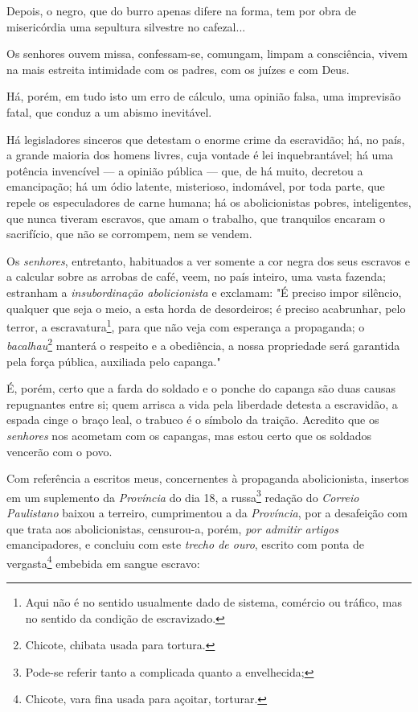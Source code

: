 Depois, o negro, que do burro apenas difere na forma, tem por obra de
misericórdia uma sepultura silvestre no cafezal...

Os senhores ouvem missa, confessam-se, comungam, limpam a consciência,
vivem na mais estreita intimidade com os padres, com os juízes e com
Deus.

Há, porém, em tudo isto um erro de cálculo, uma opinião falsa, uma
imprevisão fatal, que conduz a um abismo inevitável.

Há legisladores sinceros que detestam o enorme crime da escravidão; há,
no país, a grande maioria dos homens livres, cuja vontade é lei
inquebrantável; há uma potência invencível --- a opinião pública ---
que, de há muito, decretou a emancipação; há um ódio latente,
misterioso, indomável, por toda parte, que repele os especuladores de
carne humana; há os abolicionistas pobres, inteligentes, que nunca
tiveram escravos, que amam o trabalho, que tranquilos encaram o
sacrifício, que não se corrompem, nem se vendem.

Os \emph{senhores}, entretanto, habituados a ver somente a cor negra dos
seus escravos e a calcular sobre as arrobas de café, veem, no país
inteiro, uma vasta fazenda; estranham a \emph{insubordinação
abolicionista} e exclamam: "É preciso impor silêncio, qualquer que seja
o meio, a esta horda de desordeiros; é preciso acabrunhar, pelo terror,
a escravatura\footnote{Aqui não é no sentido usualmente dado de
  sistema, comércio ou tráfico, mas no sentido da condição de
  escravizado.}, para que não veja com esperança a propaganda; o
\emph{bacalhau}\footnote{Chicote, chibata usada para tortura.} manterá
o respeito e a obediência, a nossa propriedade será garantida pela força
pública, auxiliada pelo capanga."

É, porém, certo que a farda do soldado e o ponche do capanga são duas
causas repugnantes entre si; quem arrisca a vida pela liberdade detesta
a escravidão, a espada cinge o braço leal, o trabuco é o símbolo da
traição. Acredito que os \emph{senhores} nos acometam com os capangas,
mas estou certo que os soldados vencerão com o povo.

Com referência a escritos meus, concernentes à propaganda abolicionista,
insertos em um suplemento da \emph{Província} do dia 18, a
russa\footnote{Pode-se referir tanto a complicada quanto a
  envelhecida;} redação do \emph{Correio Paulistano} baixou a terreiro,
cumprimentou a da \emph{Província}, por a desafeição com que trata aos
abolicionistas, censurou-a, porém, \emph{por admitir artigos}
emancipadores, e concluiu com este \emph{trecho de ouro}, escrito com
ponta de vergasta\footnote{Chicote, vara fina usada para açoitar,
  torturar.} embebida em sangue escravo:

